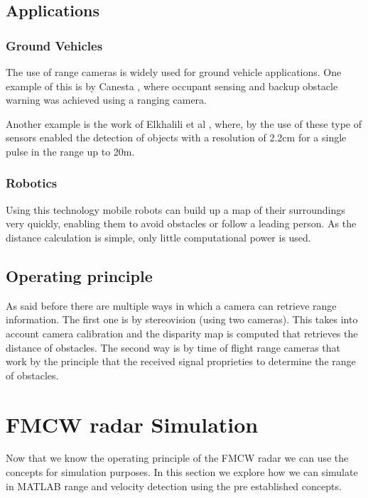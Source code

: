 \subsection{Applications}
\subsubsection{Ground Vehicles}
The use of range cameras is widely used for ground vehicle applications. One example of this is by Canesta \cite{hsu2006performance}, where  occupant sensing and backup obstacle warning was achieved using a ranging camera.

Another example is the work of Elkhalili et al \cite{eka}, where, by the use of these type of sensors enabled the detection of objects with a resolution of 2.2cm for a single pulse in the range up to 20m.

\subsubsection{Robotics}
Using this technology mobile robots can build up a map of their surroundings very quickly, enabling them to avoid obstacles or follow a leading person. As the distance calculation is simple, only little computational power is used.

\subsection{Operating principle}
As said before there are multiple ways in which a camera can retrieve range information. The first one is by stereovision (using two cameras). This takes into account camera calibration and the disparity map is computed that retrieves the distance of obstacles. The second way is by time of flight range cameras that work by the principle that the received signal proprieties to determine the range of obstacles.




\section{FMCW radar Simulation}
Now that we know the operating principle of the \ac{FMCW} \ac{radar} we can use the concepts for simulation purposes. In this section we explore how we can simulate in MATLAB range and velocity detection using the pre established concepts. 
